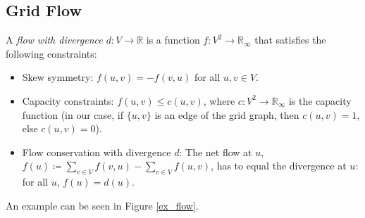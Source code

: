 \subsection{Grid Flow}
A \textit{flow with divergence $d:V\rightarrow \mathbb{R}$} is a function $f:V^2\rightarrow \mathbb{R}_\infty$ that satisfies the following constraints:
\begin{itemize}
\item Skew symmetry: $f(u,v)=-f(v,u)$ for all $u, v\in V$.
\item Capacity constraints: $f(u,v)\leq c(u,v)$, where $c:V^2\rightarrow \mathbb{R}_\infty$ is the capacity function (in our case, if $\{u,v\}$ is an edge of the grid graph, then $c(u,v)=1$, else $c(u,v)=0$).
\item Flow conservation with divergence $d$: The net flow at $u$, $f(u)\coloneqq \sum_{v\in V}f(v,u)-\sum_{v\in V}f(u,v)$, has to equal the divergence at $u$: for all $u$, $f(u)=d(u)$.
\label{def_netflow}
\end{itemize}
An example can be seen in Figure \ref{ex_flow}.

